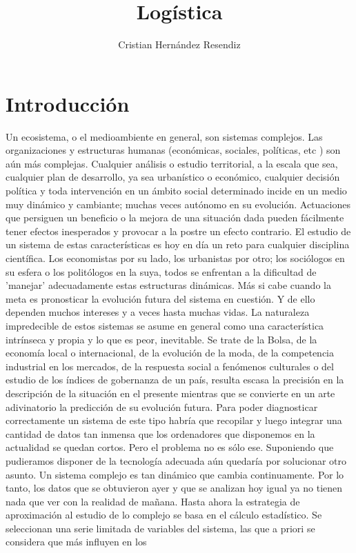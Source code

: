 \documentclass[12pt,a4paper]{book}
\author{Cristian Hernández Resendiz}
\title{Logística}
\begin{document}
	
	\tableofcontents%
	\chapter{Introducción}
	Un ecosistema, o el medioambiente en general, son sistemas complejos. Las organizaciones y estructuras
	humanas (económicas, sociales, políticas, etc ) son aún más complejas.
	Cualquier análisis o estudio territorial, a la escala que sea, cualquier plan de desarrollo, ya sea urbanístico o
	económico, cualquier decisión política y toda intervención en un ámbito social determinado incide en un medio
	muy dinámico y cambiante; muchas veces autónomo en su evolución. Actuaciones que persiguen un beneficio o
	la mejora de una situación dada pueden fácilmente tener efectos inesperados y provocar a la postre un efecto
	contrario.
	El estudio de un sistema de estas características es hoy en día un reto para cualquier disciplina científica. Los
	economistas por su lado, los urbanistas por otro; los sociólogos en su esfera o los politólogos en la suya, todos
	se enfrentan a la dificultad de 'manejar' adecuadamente estas estructuras dinámicas. Más si cabe cuando la
	meta es pronosticar la evolución futura del sistema en cuestión. Y de ello dependen muchos intereses y a veces
	hasta muchas vidas.
	La naturaleza impredecible de estos sistemas se asume en general como una característica intrínseca y propia
	y lo que es peor, inevitable. Se trate de la Bolsa, de la economía local o internacional, de la evolución de la moda,
	de la competencia industrial en los mercados, de la respuesta social a fenómenos culturales o del estudio de los
	índices de gobernanza de un país, resulta escasa la precisión en la descripción de la situación en el presente
	mientras que se convierte en un arte adivinatorio la predicción de su evolución futura.
	Para poder diagnosticar correctamente un sistema de este tipo habría que recopilar y luego integrar una
	cantidad de datos tan inmensa que los ordenadores que disponemos en la actualidad se quedan cortos. Pero
	el problema no es sólo ese. Suponiendo que pudieramos disponer de la tecnología adecuada aún quedaría por
	solucionar otro asunto. Un sistema complejo es tan dinámico que cambia continuamente. Por lo tanto, los datos
	que se obtuvieron ayer y que se analizan hoy igual ya no tienen nada que ver con la realidad de mañana.
	Hasta ahora la estrategia de aproximación al estudio de lo complejo se basa en el cálculo estadístico. Se
	seleccionan una serie limitada de variables del sistema, las que a priori se considera que más influyen en los
\end{document}
